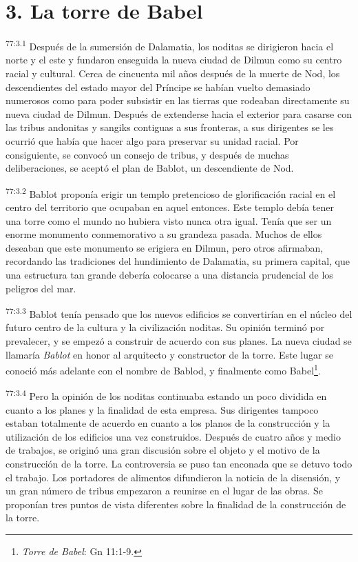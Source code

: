 \section*{3. La torre de Babel}
\par
\textsuperscript{77:3.1} Después de la sumersión de Dalamatia, los noditas se dirigieron hacia el norte y el este y fundaron enseguida la nueva ciudad de Dilmun como su centro racial y cultural. Cerca de cincuenta mil años después de la muerte de Nod, los descendientes del estado mayor del Príncipe se habían vuelto demasiado numerosos como para poder subsistir en las tierras que rodeaban directamente su nueva ciudad de Dilmun. Después de extenderse hacia el exterior para casarse con las tribus andonitas y sangiks contiguas a sus fronteras, a sus dirigentes se les ocurrió que había que hacer algo para preservar su unidad racial. Por consiguiente, se convocó un consejo de tribus, y después de muchas deliberaciones, se aceptó el plan de Bablot, un descendiente de Nod.

\par
\textsuperscript{77:3.2} Bablot proponía erigir un templo pretencioso de glorificación racial en el centro del territorio que ocupaban en aquel entonces. Este templo debía tener una torre como el mundo no hubiera visto nunca otra igual. Tenía que ser un enorme monumento conmemorativo a su grandeza pasada. Muchos de ellos deseaban que este monumento se erigiera en Dilmun, pero otros afirmaban, recordando las tradiciones del hundimiento de Dalamatia, su primera capital, que una estructura tan grande debería colocarse a una distancia prudencial de los peligros del mar.

\par
\textsuperscript{77:3.3} Bablot tenía pensado que los nuevos edificios se convertirían en el núcleo del futuro centro de la cultura y la civilización noditas. Su opinión terminó por prevalecer, y se empezó a construir de acuerdo con sus planes. La nueva ciudad se llamaría \textit{Bablot} en honor al arquitecto y constructor de la torre. Este lugar se conoció más adelante con el nombre de Bablod, y finalmente como Babel\footnote{\textit{Torre de Babel}: Gn 11:1-9.}.

\par
\textsuperscript{77:3.4} Pero la opinión de los noditas continuaba estando un poco dividida en cuanto a los planes y la finalidad de esta empresa. Sus dirigentes tampoco estaban totalmente de acuerdo en cuanto a los planos de la construcción y la utilización de los edificios una vez construidos. Después de cuatro años y medio de trabajos, se originó una gran discusión sobre el objeto y el motivo de la construcción de la torre. La controversia se puso tan enconada que se detuvo todo el trabajo. Los portadores de alimentos difundieron la noticia de la disensión, y un gran número de tribus empezaron a reunirse en el lugar de las obras. Se proponían tres puntos de vista diferentes sobre la finalidad de la construcción de la torre.

